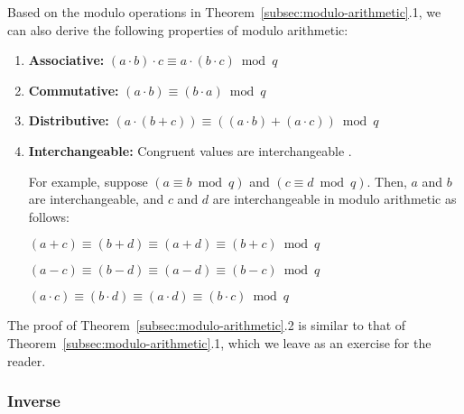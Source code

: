 Based on the modulo operations in Theorem~\ref*{subsec:modulo-arithmetic}.1, we can also derive the following properties of modulo arithmetic:


\begin{tcolorbox}[title={\textbf{\tboxtheorem{\ref*{subsec:modulo-arithmetic}.2} Properties of Modulo Arithmetic}}]

\begin{enumerate}
\item \textbf{Associative:} $(a \cdot b) \cdot c \equiv a \cdot (b \cdot c) \bmod q$

\item \textbf{Commutative:} $(a \cdot b) \equiv (b \cdot a) \bmod q$

\item \textbf{Distributive:} $(a \cdot (b + c)) \equiv ((a \cdot b) + (a \cdot c))  \bmod q$

\item \textbf{Interchangeable:} Congruent values are interchangeable . 

For example, suppose $(a \equiv b \bmod q)$ and $(c \equiv d \bmod q)$. Then, $a$ and $b$ are interchangeable, and $c$ and $d$ are interchangeable in modulo arithmetic as follows:

$(a + c) \equiv (b + d) \equiv (a + d) \equiv (b + c) \bmod q$

$(a - c) \equiv (b - d) \equiv (a - d) \equiv (b - c) \bmod q$

$(a \cdot c) \equiv (b \cdot d) \equiv (a \cdot d) \equiv (b \cdot c) \bmod q$

\end{enumerate}

\end{tcolorbox}

The proof of Theorem~\ref*{subsec:modulo-arithmetic}.2 is similar to that of Theorem~\ref*{subsec:modulo-arithmetic}.1, which we leave as an exercise for the reader. 


\subsubsection{Inverse}
\label{subsec:modulo-inverse}

